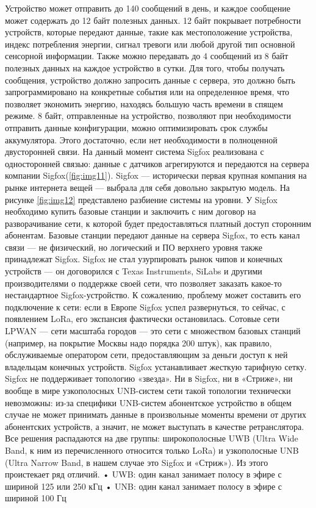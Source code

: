 Устройство может отправить до 140 сообщений в день, и каждое сообщение может содержать до 12 байт полезных данных. 12 байт покрывает потребности устройств, которые передают данные, такие как местоположение устройства, индекс потребления энергии, сигнал тревоги или любой другой тип основной сенсорной информации. 
Также можно передавать до 4 сообщений из 8 байт полезных данных на каждое устройство в сутки. Для того, чтобы получать сообщения, устройство должно запросить данные с сервера, это должно быть запрограммировано на конкретные события или на определенное время, что позволяет экономить энергию, находясь большую часть времени в спящем режиме. 8 байт, отправленные на устройство, позволяют при необходимости отправить данные конфигурации, можно оптимизировать срок службы аккумулятора. Этого достаточно, если нет необходимости в полноценной двусторонней связи. На данный момент система Sigfox реализована с односторонней связью: данные с датчиков агрегируются и передаются на сервера компании Sigfox(\ref{fig:img11}). 
Sigfox — исторически первая крупная компания на рынке интернета вещей — выбрала для себя довольно закрытую модель. На рисунке \ref{fig:img12} представлено разбиение системы на уровни. У Sigfox необходимо купить базовые станции и заключить с ним договор на разворачивание сети, к которой будет предоставляться платный доступ сторонним абонентам. Базовые станции передают данные на сервера Sigfox, то есть канал связи --- не физический, но логический и ПО верхнего уровня также принадлежат Sigfox. Sigfox не стал узурпировать рынок чипов и конечных устройств --- он договорился с Texas Instruments, SiLabs и другими производителями о поддержке своей сети, что позволяет заказать какое-то нестандартное Sigfox-устройство. К сожалению, проблему может составить его подключение к сети: если в Европе Sigfox успел развернуться, то сейчас, с появлением LoRa, его экспансия фактически остановилась.
Сотовые сети LPWAN --- сети масштаба городов --- это сети с множеством базовых станций (например, на покрытие Москвы надо порядка 200 штук), как правило, обслуживаемые оператором сети, предоставляющим за деньги доступ к ней владельцам конечных устройств. Sigfox устанавливает жесткую тарифную сетку. 
Sigfox не поддерживает топологию «звезда». Ни в Sigfox, ни в «Стриже», ни вообще в мире узкополосных UNB-систем сети такой топологии технически невозможны: из-за специфики UNB-систем абонентское устройство в общем случае не может принимать данные в произвольные моменты времени от других абонентских устройств, а значит, не может выступать в качестве ретранслятора.
Все решения распадаются на две группы: широкополосные UWB (Ultra Wide Band, к ним из перечисленного относится только LoRa) и узкополосные UNB (Ultra Narrow Band, в нашем случае это Sigfox и «Стриж»). Из этого проистекает ряд отличий.
•	UWB: один канал занимает полосу в эфире с шириной 125 или 250 кГц
•	UNB: один канал занимает полосу в эфире с шириной 100 Гц

